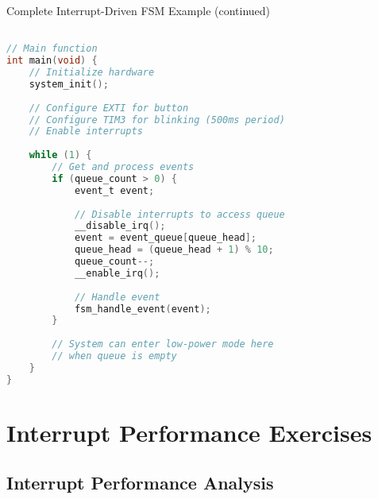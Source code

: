 \begin{example2}{Complete Interrupt-Driven FSM Example (continued)}
\begin{lstlisting}[language=C, style=basesmol]

// Main function
int main(void) {
    // Initialize hardware
    system_init();
    
    // Configure EXTI for button
    // Configure TIM3 for blinking (500ms period)
    // Enable interrupts
    
    while (1) {
        // Get and process events
        if (queue_count > 0) {
            event_t event;
            
            // Disable interrupts to access queue
            __disable_irq();
            event = event_queue[queue_head];
            queue_head = (queue_head + 1) % 10;
            queue_count--;
            __enable_irq();
            
            // Handle event
            fsm_handle_event(event);
        }
        
        // System can enter low-power mode here
        // when queue is empty
    }
}
\end{lstlisting}
\end{example2}

\section{Interrupt Performance Exercises}

\subsection{Interrupt Performance Analysis}

